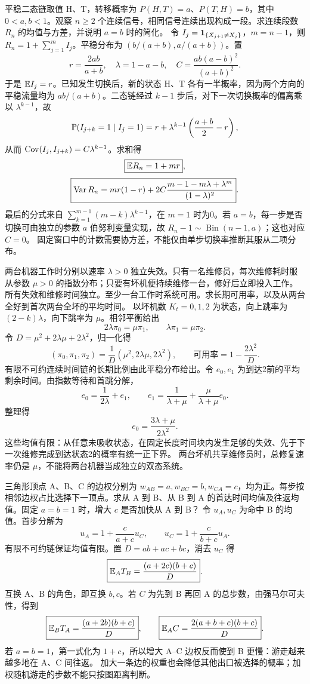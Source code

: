 平稳二态链取值 H、T，转移概率为 $P(H,T)=a$、$P(T,H)=b$，其中 $0<a,b<1$。观察 $n\ge2$ 个连续信号，相同信号连续出现构成一段。求连续段数 $R_n$ 的均值与方差，并说明 $a=b$ 时的简化。
\solution 令 $I_j=\mathbf{1}_{\{X_{j+1}\ne X_j\}}$，$m=n-1$，则 $R_n=1+\sum_{j=1}^m I_j$。平稳分布为 $(b/(a+b),a/(a+b))$。置
\[
 r=\frac{2ab}{a+b},\quad \lambda=1-a-b,\quad
 C=\frac{ab(a-b)^2}{(a+b)^2}.
\]
于是 $\mathbb{E} I_j=r$。已知发生切换后，新的状态 H、T 各有一半概率，因为两个方向的平稳流量均为 $ab/(a+b)$。二态链经过 $k-1$ 步后，对下一次切换概率的偏离乘以 $\lambda^{k-1}$，故
\[
 \mathbb{P}(I_{j+k}=1\mid I_j=1)
 =r+\lambda^{k-1}\left(\frac{a+b}{2}-r\right),
\]
从而 $\operatorname{Cov}(I_j,I_{j+k})=C\lambda^{k-1}$。求和得
\[
 \boxed{\mathbb{E} R_n=1+mr},
\]
\[
 \boxed{\operatorname{Var} R_n=mr(1-r)
 +2C\frac{m-1-m\lambda+\lambda^m}{(1-\lambda)^2}}.
\]
最后的分式来自 $\sum_{k=1}^{m-1}(m-k)\lambda^{k-1}$，在 $m=1$ 时为0。若 $a=b$，每一步是否切换可由独立的参数 $a$ 伯努利变量实现，故 $R_n-1\sim\operatorname{Bin}(n-1,a)$；这也对应 $C=0$。
\insight 固定窗口中的计数需要协方差，不能仅由单步切换率推断其服从二项分布。



两台机器工作时分别以速率 $\lambda>0$ 独立失效。只有一名维修员，每次维修耗时服从参数 $\mu>0$ 的指数分布；只要有坏机便持续维修一台，修好后立即投入工作。所有失效和维修时间独立。至少一台工作时系统可用。求长期可用率，以及从两台全好到首次两台全坏的平均时间。
\solution 以坏机数 $K_t=0,1,2$ 为状态，向上跳率为 $(2-k)\lambda$，向下跳率为 $\mu$。相邻平衡给出
\[
 2\lambda\pi_0=\mu\pi_1,\qquad
 \lambda\pi_1=\mu\pi_2.
\]
令 $D=\mu^2+2\lambda\mu+2\lambda^2$，归一化得
\[
 (\pi_0,\pi_1,\pi_2)=\frac1D(\mu^2,2\lambda\mu,2\lambda^2),
 \qquad \boxed{\text{可用率}=1-\frac{2\lambda^2}{D}}.
\]
有限不可约连续时间链的长期比例由此平稳分布给出。令 $e_0,e_1$ 为到达2前的平均剩余时间。由指数等待和首跳分解，
\[
 e_0=\frac1{2\lambda}+e_1,\qquad
 e_1=\frac1{\lambda+\mu}+\frac\mu{\lambda+\mu}e_0.
\]
整理得
\[
 \boxed{e_0=\frac{3\lambda+\mu}{2\lambda^2}}.
\]
这些均值有限：从任意未吸收状态，在固定长度时间块内发生足够的失效、先于下一次维修完成到达状态2的概率有统一正下界。
\insight 两台坏机共享维修员时，总修复速率仍是 $\mu$，不能将两台机器当成独立的双态系统。

三角形顶点 A、B、C 的边权分别为 $w_{AB}=a,w_{BC}=b,w_{CA}=c$，均为正。每步按相邻边权占比选择下一顶点。求从 A 到 B、从 B 到 A 的首达时间均值及往返均值。固定 $a=b=1$ 时，增大 $c$ 是否加快从 A 到 B？
\solution 令 $u_A,u_C$ 为命中 B 的均值。首步分解为
\[
 u_A=1+\frac c{a+c}u_C,\qquad
 u_C=1+\frac c{b+c}u_A.
\]
有限不可约链保证均值有限。置 $D=ab+ac+bc$，消去 $u_C$ 得
\[
 \boxed{\mathbb{E}_A T_B=\frac{(a+2c)(b+c)}D}.
\]
互换 A、B 的角色，即互换 $b,c$。若 $C$ 为先到 B 再回 A 的总步数，由强马尔可夫性，得到
\[
 \boxed{\mathbb{E}_B T_A=\frac{(a+2b)(b+c)}D},\qquad
 \boxed{\mathbb{E}_A C
 =\frac{2(a+b+c)(b+c)}D}.
\]
若 $a=b=1$，第一式化为 $\boxed{1+c}$，所以增大 A--C 边权反而使到 B 更慢：游走越来越多地在 A、C 间往返。
\insight 加大一条边的权重也会降低其他出口被选择的概率；加权随机游走的步数不能只按图距离判断。

